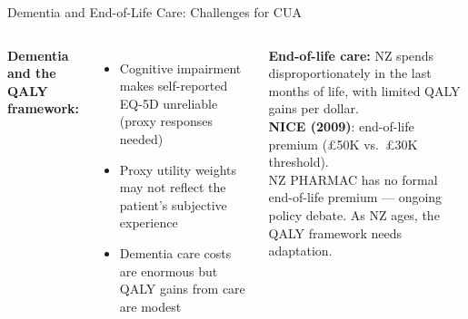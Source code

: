 \documentclass[aspectratio=169, 12pt]{beamer}
\begin{document}
\begin{frame}{Dementia and End-of-Life Care: Challenges for CUA}
  \small
  \begin{columns}
      \textbf{Dementia and the QALY framework:}
      \begin{itemize}
        \item Cognitive impairment makes self-reported EQ-5D unreliable (proxy responses needed)
        \item Proxy utility weights may not reflect the patient's subjective experience
        \item Dementia care costs are enormous but QALY gains from care are modest
      \end{itemize}
      \textbf{End-of-life care:} NZ spends disproportionately in the last months of life, with limited QALY gains per dollar.\\[0.25em]
      \textbf{NICE (2009)}: end-of-life premium (£50K vs.\ £30K threshold).\\[0.25em]
      NZ PHARMAC has no formal end-of-life premium --- ongoing policy debate. As NZ ages, the QALY framework needs adaptation.
  \end{columns}
\end{frame}

\end{document}
